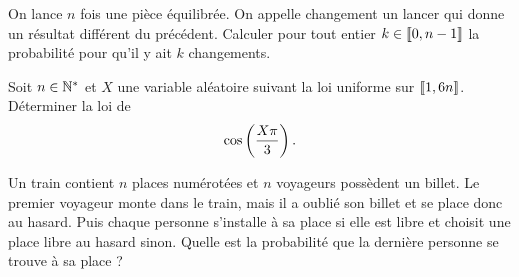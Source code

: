 \documentclass{magnolia}
\begin{document}
On lance $n$ fois une pièce équilibrée. On appelle changement un lancer qui donne un résultat différent du précédent.
Calculer pour tout entier $k \in \left\llbracket 0,n-1\right\rrbracket$ la probabilité pour qu'il y ait $k$ changements.



Soit $n\in{\mathbb{N}^*}$ et $X$ une variable aléatoire suivant la loi uniforme sur $\left\llbracket 1,6n\right\rrbracket$.
Déterminer la loi de
\[\cos\left(\frac{X\pi}{3}\right).\]


Un train contient $n$ places numérotées et $n$ voyageurs possèdent un billet. Le premier voyageur monte dans le train, mais il a oublié son billet et se place donc au hasard. Puis chaque personne s'installe à sa place si elle est libre et choisit une place libre au hasard sinon. Quelle est la probabilité que la dernière personne se trouve à sa place ?
\end{document}
